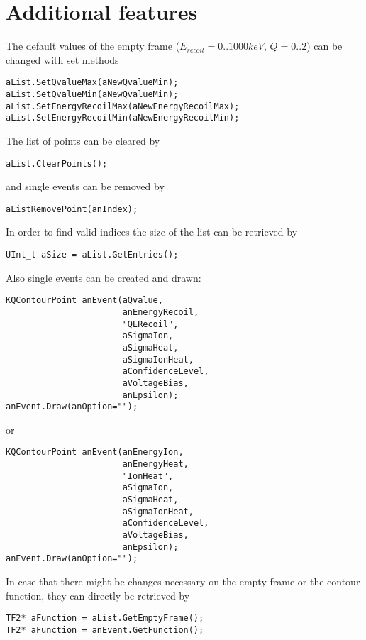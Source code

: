 \documentclass[10pt, a4paper]{article}
\begin{document}
\section{Additional features}

The default values of the empty frame ($E_{recoil} = 0..1000 keV$, $Q = 0..2$) can be changed with set methods
\begin{verbatim}
aList.SetQvalueMax(aNewQvalueMin);
aList.SetQvalueMin(aNewQvalueMin);
aList.SetEnergyRecoilMax(aNewEnergyRecoilMax);
aList.SetEnergyRecoilMin(aNewEnergyRecoilMin);
\end{verbatim}

The list of points can be cleared by
\begin{verbatim}
aList.ClearPoints();
\end{verbatim}
and single events can be removed by
\begin{verbatim}
aListRemovePoint(anIndex);
\end{verbatim}
In order to find valid indices the size of the list can be retrieved by
\begin{verbatim}
UInt_t aSize = aList.GetEntries();
\end{verbatim}

Also single events can be created and drawn:
\begin{verbatim}
KQContourPoint anEvent(aQvalue,
                       anEnergyRecoil,
                       "QERecoil",
                       aSigmaIon,
                       aSigmaHeat,
                       aSigmaIonHeat,
                       aConfidenceLevel,
                       aVoltageBias,
                       anEpsilon);
anEvent.Draw(anOption="");
\end{verbatim}
or
\begin{verbatim}
KQContourPoint anEvent(anEnergyIon,
                       anEnergyHeat,
                       "IonHeat",
                       aSigmaIon,
                       aSigmaHeat,
                       aSigmaIonHeat,
                       aConfidenceLevel,
                       aVoltageBias,
                       anEpsilon);
anEvent.Draw(anOption="");
\end{verbatim}

In case that there might be changes necessary on the empty frame or the contour function, they can directly be retrieved by
\begin{verbatim}
TF2* aFunction = aList.GetEmptyFrame();
TF2* aFunction = anEvent.GetFunction();
\end{verbatim}
\end{document}
